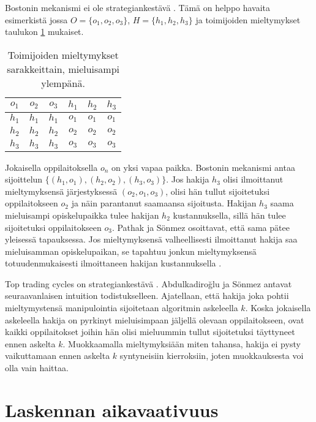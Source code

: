 \documentclass[twoside]{tktltiki}
\begin{document}
Bostonin mekanismi ei ole strategiankestävä \cite{abduson03}. Tämä on
helppo havaita esimerkistä jossa $O = \{o_1, o_2, o_3\}$, $H = \{h_1,
h_2, h_3\}$ ja toimijoiden mieltymykset taulukon
\ref{boston_strategia} mukaiset.

\begin{table}[ht]
  \begin{center}
    \begin{tabular}{ c c c | c c c }
      $o_1$ & $o_2$ & $o_3$ & $h_1$ & $h_2$ & $h_3$ \\
      \hline
      $h_1$ & $h_1$ & $h_1$ & $o_1$ & $o_1$ & $o_1$ \\
      $h_2$ & $h_2$ & $h_2$ & $o_2$ & $o_2$ & $o_2$ \\
      $h_3$ & $h_3$ & $h_3$ & $o_3$ & $o_3$ & $o_3$
    \end{tabular}
    \caption{Toimijoiden mieltymykset sarakkeittain, mieluisampi ylempänä.}
    \label{boston_strategia}
  \end{center}
\end{table}

Jokaisella oppilaitoksella $o_n$ on yksi vapaa paikka. Bostonin
mekanismi antaa sijoittelun $\{(h_1, o_1), (h_2, o_2), (h_3, o_3)\}$.
Jos hakija $h_3$ olisi ilmoittanut mieltymyksensä järjestyksessä
$(o_2, o_1, o_3)$, olisi hän tullut sijoitetuksi oppilaitokseen $o_2$
ja näin parantanut saamaansa sijoitusta. Hakijan $h_3$ saama
mieluisampi opiskelupaikka tulee hakijan $h_2$ kustannuksella, sillä
hän tulee sijoitetuksi oppilaitokseen $o_3$. Pathak ja Sönmez
osoittavat, että sama pätee yleisessä tapauksessa. Jos mieltymyksensä
valheellisesti ilmoittanut hakija saa mieluisamman opiskelupaikan, se
tapahtuu jonkun mieltymyksensä totuudenmukaisesti ilmoittaneen hakijan
kustannuksella \cite{pathak08}.

Top trading cycles on strategiankestävä \cite{abduson03}.
Abdulkadiroğlu ja Sönmez antavat seuraavanlaisen intuition
todistukselleen. Ajatellaan, että hakija joka pohtii mieltymystensä
manipulointia sijoitetaan algoritmin askeleella $k$. Koska jokaisella
askeleella hakija on pyrkinyt mieluisimpaan jäljellä olevaan
oppilaitokseen, ovat kaikki oppilaitokset joihin hän olisi mieluummin
tullut sijoitetuksi täyttyneet ennen askelta $k$. Muokkaamalla
mieltymyksiään miten tahansa, hakija ei pysty vaikuttamaan ennen
askelta $k$ syntyneisiin kierroksiin, joten muokkauksesta voi olla
vain haittaa.

\section{Laskennan aikavaativuus}
\label{aikavaativuus_luku}
\end{document}
